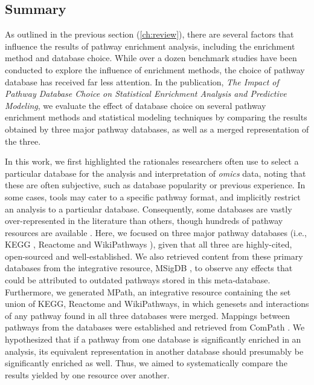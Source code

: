 \subsection*{Summary}

As outlined in the previous section (\ref{ch:review}), there are several factors that influence the results of pathway enrichment analysis, including the enrichment method and database choice. While over a dozen benchmark studies have been conducted to explore the influence of enrichment methods, the choice of pathway database has received far less attention. In the publication, \textit{The Impact of Pathway Database Choice on Statistical Enrichment Analysis and Predictive Modeling}, we evaluate the effect of database choice on several pathway enrichment methods and statistical modeling techniques by comparing the results obtained by three major pathway databases, as well as a merged representation of the three. 

In this work, we first highlighted the rationales researchers often use to select a particular database for the analysis and interpretation of \textit{omics} data, noting that these are often subjective, such as database popularity or previous experience. In some cases, tools may cater to a specific pathway format, and implicitly restrict an analysis to a particular database. Consequently, some databases are vastly over-represented in the literature than others, though  hundreds of pathway resources are available \parencite{bader2006}. Here, we focused on three major pathway databases (i.e., KEGG \parencite{kanehisa2000}, Reactome \parencite{jassal2020} and WikiPathways \parencite{martens2021}), given that all three are highly-cited, open-sourced and well-established. We also retrieved content from these primary databases from the integrative resource, MSigDB \parencite{liberzon2015}, to observe any effects that could be attributed to outdated pathways stored in this meta-database. Furthermore, we generated MPath, an integrative resource containing the set union of KEGG, Reactome and WikiPathways, in which genesets and interactions of any pathway found in all three databases were merged. Mappings between pathways from the databases were established and retrieved from ComPath \parencite{domingo2018}. We hypothesized that if a pathway from one database is significantly enriched in an analysis, its equivalent representation in another database should presumably be significantly enriched as well. Thus, we aimed to systematically compare the results yielded by one resource over another.

